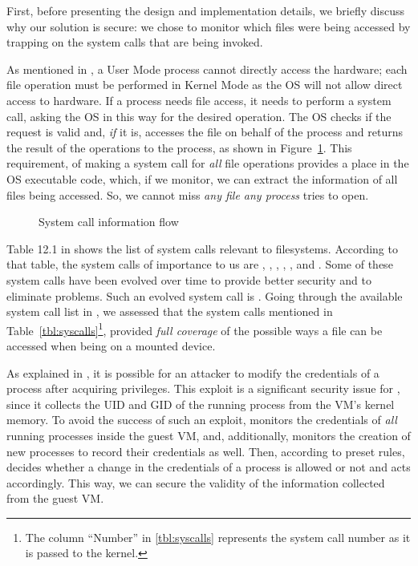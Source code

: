 \par First, before presenting the design and implementation details, we briefly discuss why our solution is secure: we chose to monitor which files were being accessed by trapping on the system calls that are being invoked. 

\par As mentioned in \cite{linuxkernel}, a User Mode process cannot directly access the hardware; each file operation must be performed in Kernel Mode as the \ac{OS} will not allow direct access to hardware. If a process needs file access, it needs to perform a system call, asking the \ac{OS} in this way for the desired operation. The \ac{OS} checks if the request is valid and, \emph{if} it is, accesses the file on behalf of the process and returns the result of the operations to the process, as shown in Figure~\ref{fig:syscall}. This requirement, of making a system call for \emph{all} file operations provides a place in the \ac{OS} executable code, which, if we monitor, we can extract the information of all files being accessed. So, we cannot miss \emph{any file any process} tries to open.

\begin{figure}[ht]
	\centering
	
	\caption{System call information flow}
	\label{fig:syscall}
\end{figure}

\par Table 12.1 in \cite{linuxkernel} shows the list of system calls relevant to filesystems. According to that table, the system calls of importance to us are , , , , , and . Some of these system calls have been evolved over time to provide better security and to eliminate problems. Such an evolved system call is . Going through the available system call list in , we assessed that the system calls mentioned in Table~\ref{tbl:syscalls}\footnote{The column ``Number'' in \ref{tbl:syscalls} represents the system call number as it is passed to the kernel.}, provided \emph{full coverage} of the possible ways a file can be accessed when being on a mounted device. 

\par As explained in \cite{perla2010guide}, it is possible for an attacker to modify the credentials of a process after acquiring  privileges. This exploit is a significant security issue for , since it collects the \ac{UID} and \ac{GID} of the running process from the \ac{VM}'s kernel memory. To avoid the success of such an exploit,  monitors the credentials of \emph{all} running processes inside the guest \ac{VM}, and, additionally, monitors the creation of new processes to record their credentials as well. Then, according to preset rules,  decides whether a change in the credentials of a process is allowed or not and acts accordingly. This way, we can secure the validity of the information collected from the guest \ac{VM}.


